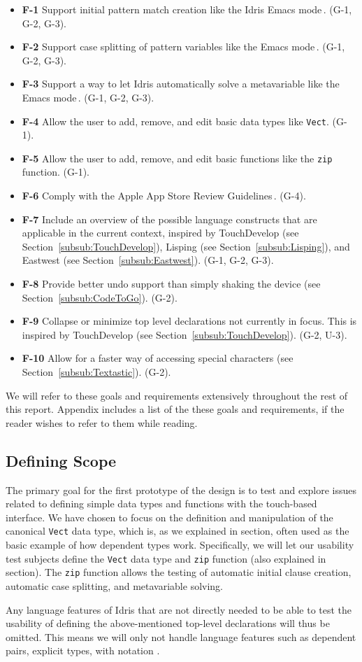 \begin{itemize}
	\item \textbf{F-1} Support initial pattern match creation like the Idris Emacs mode\,\cite{Idris:EmacsMode}. (G-1, G-2, G-3).
	\item \textbf{F-2} Support case splitting of pattern variables like the Emacs mode\,\cite{Idris:EmacsMode}. (G-1, G-2, G-3).
	\item \textbf{F-3} Support a way to let Idris automatically solve a metavariable like the Emacs mode\,\cite{Idris:EmacsMode}. (G-1, G-2, G-3).
	\item \textbf{F-4} Allow the user to add, remove, and edit basic data types like \texttt{Vect}. (G-1).
	\item \textbf{F-5} Allow the user to add, remove, and edit basic functions like the \texttt{zip} function. (G-1).
	\item \textbf{F-6} Comply with the Apple App Store Review Guidelines\,\cite{AppStoreGuidelines}. (G-4).
	\item \textbf{F-7} Include an overview of the possible language constructs that are	applicable in the current context, inspired by TouchDevelop (see Section~\ref{subsub:TouchDevelop}), Lisping (see Section~\ref{subsub:Lisping}), and Eastwest (see Section~\ref{subsub:Eastwest}). (G-1, G-2, G-3).
	\item \textbf{F-8} Provide better undo support than simply shaking the device (see Section~\ref{subsub:CodeToGo}). (G-2).
	\item \textbf{F-9} Collapse or minimize top level declarations not currently in focus. This is inspired by TouchDevelop	(see Section~\ref{subsub:TouchDevelop}). (G-2, U-3).
	\item \textbf{F-10} Allow for a faster way of accessing special characters (see Section~\ref{subsub:Textastic}). (G-2).
\end{itemize}

We will refer to these goals and requirements extensively throughout the rest of this report. Appendix includes a list of the these goals and requirements, if the reader wishes to refer to them while reading.

\subsection{Defining Scope} 
The primary goal for the first prototype of the design is to test and explore
issues related to defining simple data types and functions with the touch-based interface. 
We have chosen to focus on the definition and manipulation of the canonical \texttt{Vect} data type, which is, as we explained in section, often used as the basic example of how dependent types work.
Specifically, we will let our usability test subjects define the \texttt{Vect} data type and \texttt{zip} function (also explained in section).
The \texttt{zip} function allows the testing of automatic initial clause creation, automatic case splitting, and metavariable solving.

Any language features of Idris that are not directly needed to be able to test the usability of defining the above-mentioned top-level declarations will thus be omitted. This means we will only not handle language features such as dependent pairs, explicit types, with notation .
